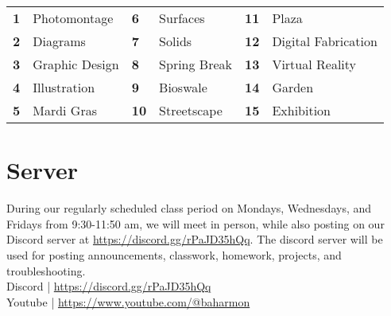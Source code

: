 \documentclass[11pt,article,oneside]{memoir}
\begin{document}
\begin{table}[H]
\begin{tabular}{l l @{\hskip 1.5cm} l l @{\hskip 1.5cm} l l}
\small
\textbf{1} & Photomontage & \textbf{6} & Surfaces & \textbf{11} & Plaza\\
\textbf{2} & Diagrams & \textbf{7} & Solids & \textbf{12} &  Digital Fabrication\\
\textbf{3} & Graphic Design & \textbf{8} & Spring Break & \textbf{13} & Virtual Reality\\
\textbf{4} & Illustration & \textbf{9} & Bioswale & \textbf{14} & Garden\\
\textbf{5} & Mardi Gras & \textbf{10} & Streetscape & \textbf{15} & Exhibition \\[0.15cm]
\end{tabular}
\end{table}


\section{Server}

During our regularly scheduled class period
on Mondays, Wednesdays, and Fridays from 9:30-11:50 am,
we will meet in person, while also posting
on our Discord server at \url{https://discord.gg/rPaJD35hQq}.
The discord server will be used for posting
announcements, classwork, homework, projects, and troubleshooting. 
\\

\noindent
Discord | \url{https://discord.gg/rPaJD35hQq}\\
Youtube | \url{https://www.youtube.com/@baharmon}\\

%
\end{document}
